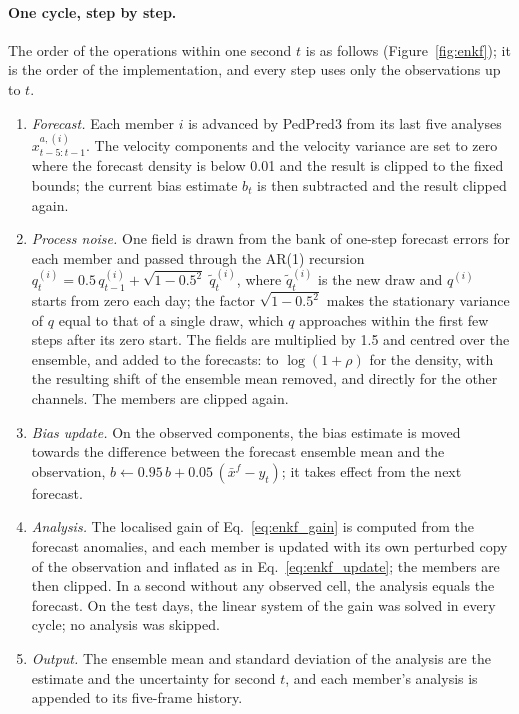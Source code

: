 \documentclass[english, 12pt, a4paper, elec, utf8, a-2b, online]{aaltothesis}
\begin{document}
\paragraph{One cycle, step by step.}
The order of the operations within one second $t$ is as follows
(Figure~\ref{fig:enkf}); it is the order of the implementation, and every step
uses only the observations up to $t$.
\begin{enumerate}
	\item \emph{Forecast.} Each member $i$ is advanced by PedPred3 from its last
	five analyses $x^{a,(i)}_{t-5:t-1}$. The velocity components and the velocity
	variance are set to zero where the forecast density is below 0.01 and the
	result is clipped to the fixed bounds; the current bias estimate $b_t$
	is then subtracted and the result clipped again.
	\item \emph{Process noise.} One field is drawn from the bank of one-step
	forecast errors for each member and passed through the AR(1) recursion
	$q^{(i)}_t = 0.5\, q^{(i)}_{t-1} + \sqrt{1 - 0.5^2}\; \tilde{q}^{(i)}_t$, where
	$\tilde{q}^{(i)}_t$ is the new draw and $q^{(i)}$ starts from zero each day; the
	factor $\sqrt{1 - 0.5^2}$ makes the stationary variance of $q$ equal to that
	of a single draw, which $q$ approaches within the first few steps after its
	zero start. The fields
	are multiplied by 1.5 and centred over the ensemble, and added to the
	forecasts: to $\log(1+\rho)$ for the density, with the resulting shift of the
	ensemble mean removed, and directly for the other channels. The members are
	clipped again.
	\item \emph{Bias update.} On the observed components, the bias estimate is
	moved towards the difference between the forecast ensemble mean and the
	observation, $b \leftarrow 0.95\, b + 0.05\,(\bar{x}^f - y_t)$; it takes
	effect from the next forecast.
	\item \emph{Analysis.} The localised gain of Eq.~\eqref{eq:enkf_gain} is
	computed from the forecast anomalies, and each member is updated with its own
	perturbed copy of the observation and inflated as in
	Eq.~\eqref{eq:enkf_update}; the members are then clipped. In a second without
	any observed cell, the analysis equals the forecast. On the test days, the
	linear system of the gain was solved in every cycle; no analysis was skipped.
	\item \emph{Output.} The ensemble mean and standard deviation of the
	analysis are the estimate and the uncertainty for second $t$, and each
	member's analysis is appended to its five-frame history.
\end{enumerate}
\end{document}
